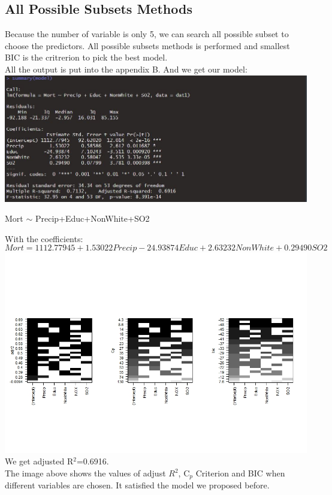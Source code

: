 \documentclass[12pt,a4paper]{article}
\begin{document}
\subsection{All Possible Subsets Methods}
Because the number of variable is only 5, we can search all possible subset to choose the predictors. All possible subsets methods is performed and smallest BIC is the critrerion to pick the best model.\\
\newline
All the output is put into the appendix B. And we get our model:
\newline
\includegraphics[scale=0.6]{b1.JPG}
\begin{center}
Mort $\sim$ Precip+Educ+NonWhite+SO2
\end{center}
With the coefficients:
\[
Mort=1112.77945+1.53022Precip-24.93874Educ+2.63232NonWhite+0.29490SO2
\]
\includegraphics[scale=0.65]{apm.jpeg}
\newline
We get adjusted R$^2$=0.6916.\\
\newline
The image above shows the values of adjust $R^2$, C$_p$ Criterion and BIC when dif{}ferent variables are chosen. It satisfied the model we proposed before.
\end{document}
